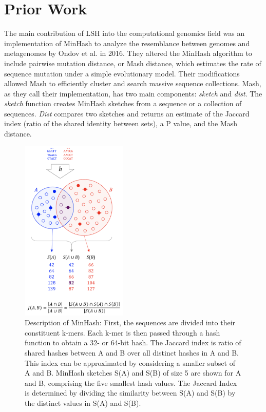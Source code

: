 \documentclass[12pt, letterpaper]{article}
\begin{document}
\section{Prior Work}
The main contribution of LSH into the computational genomics field was an implementation of MinHash to analyze the resemblance between genomes and metagenomes by Ondov et al. in 2016.\cite{MinHash} They altered the MinHash algorithm to include pairwise mutation distance, or Mash distance, which estimates the rate of sequence mutation under a simple evolutionary model. Their modifications allowed Mash to efficiently cluster and search massive sequence collections. Mash, as they call their implementation, has two main components: \textit{sketch} and \textit{dist}. The \textit{sketch} function creates MinHash sketches from a sequence or a collection of sequences. \textit{Dist} compares two sketches and returns an estimate of the Jaccard index (ratio of the shared identity between sets), a P value, and the Mash distance.
\FloatBarrier
\begin{figure}[h!]
	\centering
	\includegraphics[width=0.45\textwidth]{Mash_description.png}
	\caption{Description of MinHash: First, the sequences are divided into their constituent k-mers. Each k-mer is then passed through a hash function to obtain a 32- or 64-bit hash. The Jaccard index is ratio of shared hashes between A and B over all distinct hashes in A and B. This index can be approximated by considering a smaller subset of A and B. MinHash sketches S(A) and S(B) of size 5 are shown for A and B, comprising the five smallest hash values. The Jaccard Index is determined by dividing the similarity between S(A) and S(B) by the distinct values in S(A) and S(B).}
\end{figure}
\end{document}
